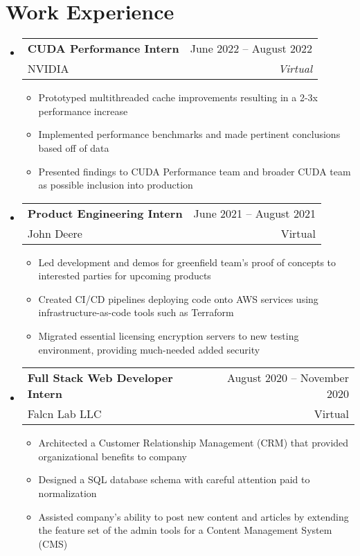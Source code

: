 \documentclass[letterpaper,12pt]{article} %
\makeatletter
\newcommand{\CVItem}[1]{
  \item\small{
    {#1 \vspace{-2pt}}
  }
}
\newcommand{\CVSubheading}[4]{
  \vspace{-2pt}\item
    \begin{tabular*}{0.97\textwidth}[t]{l@{\extracolsep{\fill}}r}
      \textbf{#1} & #2 \\
      \small#3 & \small #4 \\
    \end{tabular*}\vspace{-7pt}
}
\newcommand{\CVSubHeadingListStart}{\begin{itemize}[leftmargin=0.15in, label={}]} %
\newcommand{\CVSubHeadingListEnd}{\end{itemize}}
\newcommand{\CVItemListStart}{\begin{itemize}}
\newcommand{\CVItemListEnd}{\end{itemize}\vspace{-5pt}}
\makeatother
\begin{document}
\section{Work Experience}
\CVSubHeadingListStart
\CVSubheading
{CUDA Performance Intern}{June 2022 -- August 2022}
{NVIDIA}{\textit{Virtual}}
\CVItemListStart
\CVItem{Prototyped multithreaded cache improvements resulting in a 2-3x performance increase}
\CVItem{Implemented performance benchmarks and made pertinent conclusions based off of data}
\CVItem{Presented findings to CUDA Performance team and broader CUDA team as possible inclusion into production}
\CVItemListEnd
\CVSubheading
{Product Engineering Intern}{June 2021 -- August 2021}
{John Deere}{Virtual}
\CVItemListStart
\CVItem{Led development and demos for greenfield team's proof of concepts to interested parties for upcoming products}
\CVItem{Created CI/CD pipelines deploying code onto AWS services using infrastructure-as-code tools such as Terraform}
\CVItem{Migrated essential licensing encryption servers to new testing environment, providing much-needed added security}
\CVItemListEnd
\CVSubheading
{Full Stack Web Developer Intern}{August 2020 -- November 2020}
{Falcn Lab LLC}{Virtual}
\CVItemListStart
\CVItem{Architected a Customer Relationship Management (CRM) that provided organizational benefits to company}
\CVItem{Designed a SQL database schema with careful attention paid to normalization}
\CVItem{Assisted company's ability to post new content and articles by extending the feature set of the admin tools for a Content Management System (CMS)}
\CVItemListEnd
\CVSubHeadingListEnd

\vspace{-10pt} %
\end{document}
